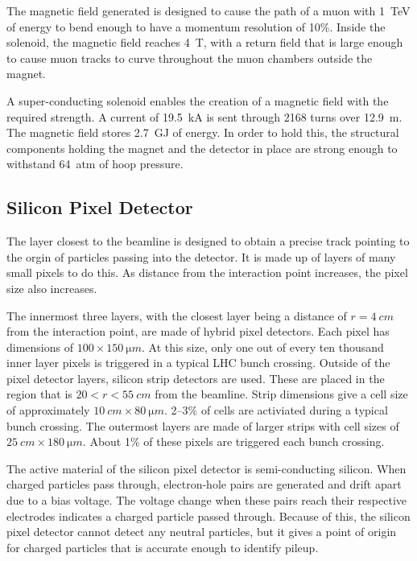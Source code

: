 The magnetic field generated is designed to cause the path of
a muon with \SI{1}{TeV} of energy to bend enough to have a momentum resolution of 10\%.
Inside the solenoid, the magnetic field reaches \SI{4}{T},
with a return field that is large enough to cause muon tracks to curve throughout
the muon chambers outside the magnet.

A super-conducting solenoid enables the creation of a magnetic field
with the required strength.
A current of \SI{19.5}{kA} is sent through 2168 turns over \SI{12.9}{m}.
The magnetic field stores \SI{2.7}{GJ} of energy.
In order to hold this, the structural components holding the magnet and
the detector in place are strong enough to withstand \SI{64}{atm} of hoop pressure.

\subsection{Silicon Pixel Detector}

The layer closest to the beamline is designed to obtain a precise track pointing
to the orgin of particles passing into the detector.
It is made up of layers of many small pixels to do this.
As distance from the interaction point increases, the pixel size also increases.

The innermost three layers, with the closest layer being a distance of $r=\SI{4}{cm}$ from the interaction point,
are made of hybrid pixel detectors.
Each pixel has dimensions of $100 \times \SI{150}{\micro m}$.
At this size, only one out of every ten thousand inner layer pixels is triggered in a typical LHC bunch crossing.
Outside of the pixel detector layers,
silicon strip detectors are used.
These are placed in the region that is $20 < r < \SI{55}{cm}$ from the beamline.
Strip dimensions give a cell size of approximately $\SI{10}{cm} \times \SI{80}{\micro m}$.
2--3\% of cells are activiated during a typical bunch crossing.
The outermost layers are made of larger strips with cell sizes of $\SI{25}{cm} \times \SI{180}{\micro m}$.
About 1\% of these pixels are triggered each bunch crossing.

The active material of the silicon pixel detector is semi-conducting silicon.
When charged particles pass through, electron-hole pairs are generated and drift apart due to a bias voltage.
The voltage change when these pairs reach their respective electrodes indicates a charged particle passed through.
Because of this, the silicon pixel detector cannot detect any neutral particles,
but it gives a point of origin for charged particles that is accurate enough to identify pileup.

